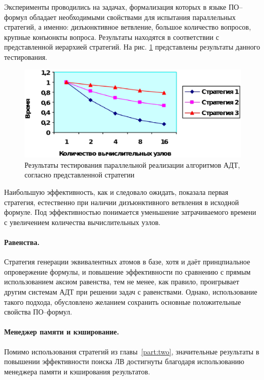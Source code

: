 Эксперименты проводились на задачах, формализация которых в языке ПО--формул обладает необходимыми свойствами для испытания параллельных стратегий, а именно: дизъюнктивное ветвление, большое количество вопросов, крупные конъюнкты вопроса. Результаты находятся в соответствии с представленной иерархией стратегий. На рис. \ref{fig:parallel} представлены результаты данного тестирования.
\begin{figure}[h]
	\centering
	\includegraphics[width=0.7\linewidth]{pics/Parallel.eps}
	\caption{Результаты тестирования параллельной реализации алгоритмов АДТ, согласно представленной стратегии}
	\label{fig:parallel}
\end{figure}

Наибольшую эффективность, как и следовало ожидать, показала первая стратегия, естественно при наличии дизъюнктивного ветвления в исходной формуле. Под эффективностью понимается уменьшение затрачиваемого времени с увеличением количества вычислительных узлов.


\paragraph{Равенства.}
Стратегия генерации эквивалентных атомов в базе, хотя и даёт принцпиальное опровержение формулы, и повышение эффективности по сравнению с прямым использованием аксиом равенства, тем не менее, как правило, проигрывает другим системам АДТ при решении задач с равенствами. Однако, использование такого подхода, обусловлено желанием сохранить основные положительные свойства ПО--формул.

\paragraph{Менеджер памяти и кэширование.}
Помимо использования стратегий из главы~\ref{part:two}, значительные результаты в повышении эффективности поиска ЛВ достигнуты благодаря использованию менеджера памяти и кэширования результатов.

